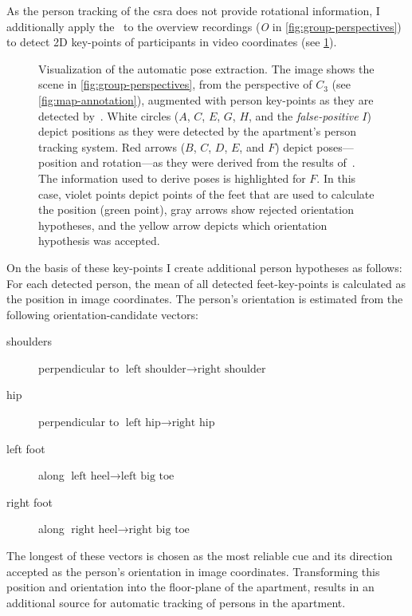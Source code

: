 As the person tracking of the \gls{csra} does not provide rotational information, I additionally apply the~ to the overview recordings (\emph{O} in \cref{fig:group-perspectives}) to detect 2D key-points of participants in video coordinates (see \cref{fig:group-openpose}).
\begin{figure}[htb!]
    \centering
    \def\svgwidth{0.95\textwidth}
    \begin{footnotesize}
    
    \end{footnotesize}
    \caption[Automatic pose extraction.]{\label{fig:group-openpose}
    Visualization of the automatic pose extraction.
    The image shows the scene in \cref{fig:group-perspectives}, from the perspective of \(C_3\) (see \cref{fig:map-annotation}), augmented with person key-points as they are detected by~.
    White circles (\(A\), \(C\), \(E\), \(G\), \(H\), and the \emph{false-positive} \(I\)) depict positions as they were detected by the \gls{apartment}'s person tracking system.
    Red arrows (\(B\), \(C\), \(D\), \(E\), and \(F\)) depict poses---position and rotation---as they were derived from the results of~.
    The information used to derive poses is highlighted for \(F\).
    In this case, violet points depict points of the feet that are used to calculate the position (green point), gray arrows show rejected orientation hypotheses, and the yellow arrow depicts which orientation hypothesis was accepted.
    }
\end{figure}
On the basis of these key-points I create additional person hypotheses as follows:
For each detected person, the mean of all detected feet-key-points is calculated as the position in image coordinates.
The person's orientation is estimated from the following orientation-candidate vectors:
\begin{description}
    \item[shoulders] perpendicular to \(\text{left shoulder} \rightarrow \text{right shoulder}\)
    \item[hip] perpendicular to \(\text{left hip} \rightarrow \text{right hip}\)
    \item[left foot] along \(\text{left heel} \rightarrow \text{left big toe}\)
    \item[right foot] along \(\text{right heel} \rightarrow \text{right big toe}\)
\end{description}
The longest of these vectors is chosen as the most reliable cue and its direction accepted as the person's orientation in image coordinates.
Transforming this position and orientation into the floor-plane of the \gls{apartment}, results in an additional source for automatic tracking of persons in the \gls{apartment}.

